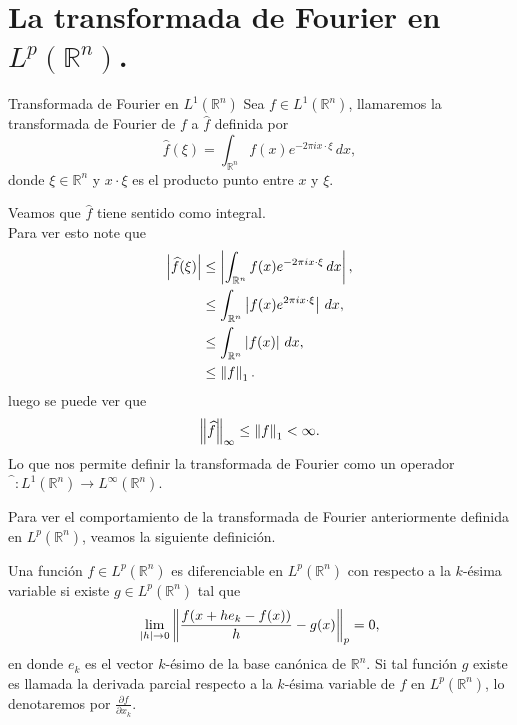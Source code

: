 \section{La transformada de Fourier en $L^{p}(\mathbb{R}^{n})$.}
  \begin{definition}{Transformada de Fourier en $L^{1}(\mathbb{R}^{n})$}
    Sea $f\in L^{1}(\mathbb{R}^{n})$, llamaremos la transformada de Fourier de $f$ a $\hat{f}$ definida por
    \begin{equation}
      \hat{f}(\xi)=\int_{\mathbb{R}^{n}}f(x)e^{-2\pi i x\cdot \xi}\,dx,
    \end{equation}
    donde $\xi\in\mathbb{R}^{n}$ y $x\cdot\xi$ es el producto punto entre $x$ y $\xi$. 
  \end{definition}
  \begin{note}{}\label{note:f-tranformada-sentido}
    Veamos que $\hat{f}$ tiene sentido como integral.\\
    Para ver esto note que
    \begin{align*}
      \left| \widehat{f}(\xi) \right|&\leq\left| \int_{\mathbb{R}^{n}}f(x)e^{-2\pi ix\cdot\xi}\,dx \right|,\\
      &\leq \int_{\mathbb{R}^{n}}\left| f(x)e^{2\pi ix\cdot\xi} \right|\,dx,\\
      &\leq \int_{\mathbb{R}^{n}}\left| f(x) \right|\,dx,\\
      &\leq \left\lVert f\right\rVert_{1}.
    \end{align*}
    luego se puede ver que
    \begin{align*}
      \left\lVert\widehat{f}\right\rVert_{\infty}\leq \left\lVert f\right\rVert_{1}<\infty.
    \end{align*}
    Lo que nos permite definir la transformada de Fourier como un operador $\hat{\phantom{f}}:L^{1}(\mathbb{R}^{n})\to L^{\infty}(\mathbb{R}^{n})$.
  \end{note}
  Para ver el comportamiento de la transformada de Fourier anteriormente definida en $L^{p}(\mathbb{R}^{n})$, veamos la siguiente definición.
  \begin{definition}{}
    Una función $f\in L^{p}(\mathbb{R}^{n})$ es diferenciable en $L^{p}(\mathbb{R}^{n})$ con respecto a la $k$-ésima variable si existe $g\in L^{p}(\mathbb{R}^{n})$ tal que
    \begin{align*}
      \lim_{|h| \to 0}\left\lVert\frac{f(x+he_{k}-f(x))}{h}-g(x)\right\rVert_{p}=0,
    \end{align*}
    en donde $e_k$ es el vector $k$-ésimo de la base canónica de $\mathbb{R}^{n}$.
    Si tal función $g$ existe es llamada la derivada parcial respecto a la $k$-ésima variable de $f$ en $L^{p}(\mathbb{R}^{n})$, lo denotaremos por $\frac{\partial f}{\partial x_{k}}$. 
  \end{definition}
